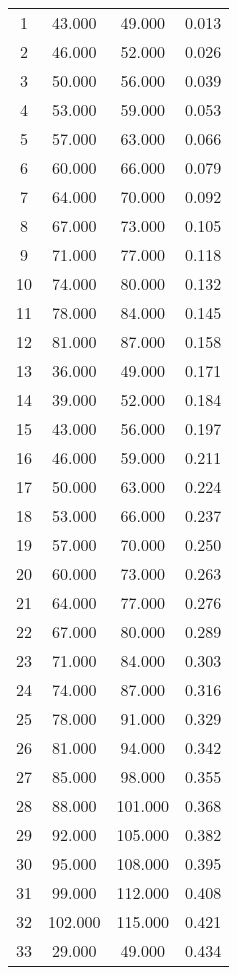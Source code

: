 % 
\begin{tabular}{cccc}
  \hline
  \hline
1 & 43.000 & 49.000 & 0.013 \\ 
  2 & 46.000 & 52.000 & 0.026 \\ 
  3 & 50.000 & 56.000 & 0.039 \\ 
  4 & 53.000 & 59.000 & 0.053 \\ 
  5 & 57.000 & 63.000 & 0.066 \\ 
  6 & 60.000 & 66.000 & 0.079 \\ 
  7 & 64.000 & 70.000 & 0.092 \\ 
  8 & 67.000 & 73.000 & 0.105 \\ 
  9 & 71.000 & 77.000 & 0.118 \\ 
  10 & 74.000 & 80.000 & 0.132 \\ 
  11 & 78.000 & 84.000 & 0.145 \\ 
  12 & 81.000 & 87.000 & 0.158 \\ 
  13 & 36.000 & 49.000 & 0.171 \\ 
  14 & 39.000 & 52.000 & 0.184 \\ 
  15 & 43.000 & 56.000 & 0.197 \\ 
  16 & 46.000 & 59.000 & 0.211 \\ 
  17 & 50.000 & 63.000 & 0.224 \\ 
  18 & 53.000 & 66.000 & 0.237 \\ 
  19 & 57.000 & 70.000 & 0.250 \\ 
  20 & 60.000 & 73.000 & 0.263 \\ 
  21 & 64.000 & 77.000 & 0.276 \\ 
  22 & 67.000 & 80.000 & 0.289 \\ 
  23 & 71.000 & 84.000 & 0.303 \\ 
  24 & 74.000 & 87.000 & 0.316 \\ 
  25 & 78.000 & 91.000 & 0.329 \\ 
  26 & 81.000 & 94.000 & 0.342 \\ 
  27 & 85.000 & 98.000 & 0.355 \\ 
  28 & 88.000 & 101.000 & 0.368 \\ 
  29 & 92.000 & 105.000 & 0.382 \\ 
  30 & 95.000 & 108.000 & 0.395 \\ 
  31 & 99.000 & 112.000 & 0.408 \\ 
  32 & 102.000 & 115.000 & 0.421 \\ 
  33 & 29.000 & 49.000 & 0.434 \\ 

\end{tabular}
